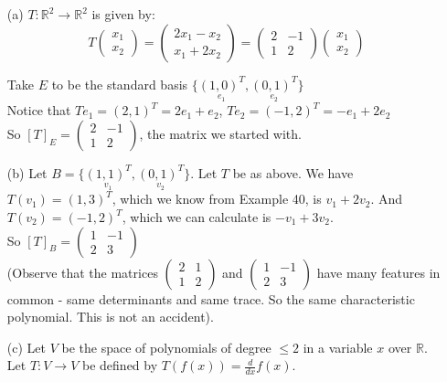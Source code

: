 \documentclass[twoside]{scrartcl}
\begin{document}
\begin{examples}
\begin{itemize}
\item[(a)] $T: \mathbb{R}^2 \to \mathbb{R}^2$ is given by:
\[
T\begin{pmatrix}
x_1 \\ x_2
\end{pmatrix}
=
\begin{pmatrix}
2x_1 - x_2 \\ x_1 + 2x_2
\end{pmatrix}
= 
\begin{pmatrix}
2 & -1 \\ 1 & 2 
\end{pmatrix}\begin{pmatrix}
x_1 \\ x_2
\end{pmatrix}
\]


Take $E$ to be the standard basis $\{\underset{e_1}{(1,0)^T},\underset{e_2}{(0,1)^T}\}$\\
Notice that $Te_1 = (2,1)^T = 2e_1 + e_2$, $Te_2 = (-1,2)^T = -e_1 + 2e_2$\\

So $[T]_E = \begin{pmatrix}
 2 & -1 \\ 1 & 2
 \end{pmatrix}
$, the matrix we started with. 

\item[(b)] Let $B = \{\underset{v_1}{(1,1)^T},\underset{v_2}{(0,1)^T}\}$. Let $T$ be as above. We have $T(v_1) = (1,3)^T$, which we know from Example 40, is $v_1 + 2v_2$. And $T(v_2) = (-1,2)^T$, which we can calculate is $-v_1 + 3v_2$.\\
 So $[T]_B = \begin{pmatrix}
 1 & -1 \\ 2 & 3
 \end{pmatrix}$\\

 (Observe that the matrices $\begin{pmatrix}
 2 & 1 \\ 1 & 2
 \end{pmatrix}$ and $\begin{pmatrix}
 1 & -1 \\ 2 & 3
 \end{pmatrix}$ have many features in common - same determinants and same trace. So the same characteristic polynomial. This is not an accident). 

\item[(c)] Let $V$ be the space of polynomials of degree $\leq 2$ in a variable $x$ over $\mathbb{R}$. Let $T: V \to V$ be defined by $T(f(x)) = \frac{d}{dx}f(x)$.\\


\end{itemize}
\end{examples}
\end{document}
